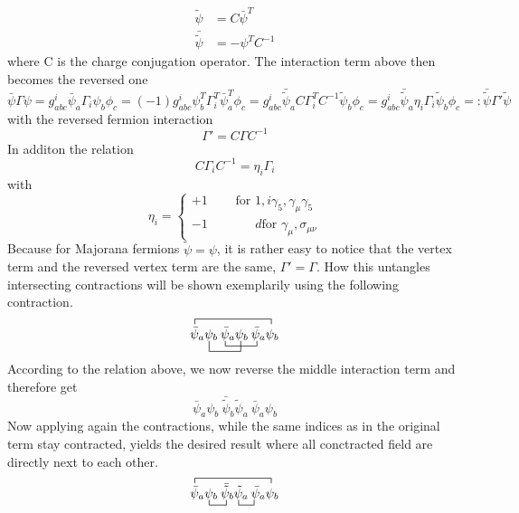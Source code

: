 \begin{align*}
	\tilde{\psi}&=C\bar{\psi}^T\\
	\bar{\tilde{\psi}}&=-\psi^T C^{-1}
\end{align*}
where C is the charge conjugation operator. The interaction term above then becomes the reversed one
\begin{equation*}
		\bar{\psi}\Gamma\psi=g^i_{abc}\bar{\psi}_a\Gamma_i\psi_b\phi_c=(-1)g^i_{abc}\psi_b^T\Gamma_i^T\bar{\psi}_a^T\phi_c=g^i_{abc}\bar{\tilde{\psi}}_aC\Gamma_i^TC^{-1}\tilde{\psi}_b\phi_c=g^i_{abc}\bar{\tilde{\psi}}_a\eta_i\Gamma_i\tilde{\psi}_b\phi_c=:\bar{\tilde{\psi}}\Gamma'\tilde{\psi}
\end{equation*}
with the reversed fermion interaction
\begin{equation*}
	\Gamma'=C\Gamma C^{-1}
\end{equation*}
In additon the relation
\begin{equation*}
	C\Gamma_i C^{-1}=\eta_i\Gamma_i
\end{equation*}
with 
\begin{equation*}
	\eta_i=\left\{\begin{array}{c}+1\:\:\:\:\:\:\:\:\:\:\text{for } 1,i\gamma_5,\gamma_\mu\gamma_5\\-1\:\:\:\:\:\:\:\:\:\:\:\:\:\:\:\:\:d\text{for }\gamma_\mu,\sigma_{\mu\nu}\end{array}\right.
\end{equation*}
Because for Majorana fermions $\tilde{\psi}=\psi$, it is rather easy to notice that the vertex term and the reversed vertex term are the same, $\Gamma'=\Gamma$. \newline
How this untangles intersecting contractions will be shown exemplarily using the following contraction.
\begin{equation*}
	\contraction{}{\bar{\psi}}{{_a\psi_b\:\bar{\psi}_a\psi_b\:\bar{\psi}_a}}{\psi}
	\bcontraction[2ex]{\bar{\psi}_a}{\psi}{{}_b\:\bar{\psi}_a}{\psi}
	\bcontraction{\bar{\psi}_a\psi_b\:}{\bar{\psi}}{{}_a\psi_b\:}{\bar{\psi}}
	\bar{\psi}_a\psi_b\:\bar{\psi}_a\psi_b\:\bar{\psi}_a\psi_b
\end{equation*}
According to the relation above, we now reverse the middle interaction term and therefore get
\begin{equation*}
	\bar{\psi}_a\psi_b\:\bar{\tilde{\psi}}_b\tilde{\psi}_a\:\bar{\psi}_a\psi_b
\end{equation*}
Now applying again the contractions, while the same indices as in the original term stay contracted, yields the desired result where all conctracted field are directly next to each other. 
\begin{equation*}
\contraction{}{\bar{\psi}}{{_a\psi_b\:\bar{\psi}_a\psi_b\:\bar{\psi}_a}}{\psi}
\bcontraction{\bar{\psi}_a}{\psi}{{}_b\:}{\psi}
\bcontraction{\bar{\psi}_a\psi_b\:\bar{\tilde{\psi}}_b}{\bar{\psi}}{{}_a}{\bar{\psi}}
\bar{\psi}_a\psi_b\:\bar{\tilde{\psi}}_b\tilde{\psi}_a\:\bar{\psi}_a\psi_b
\end{equation*}






